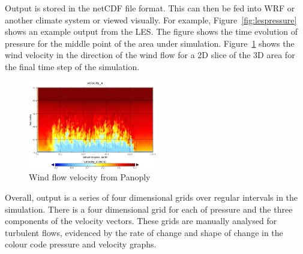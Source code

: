 Output is stored in the netCDF file format. This can then be fed into WRF or
another climate system or viewed visually. For example,
Figure~\ref{fig:lespressure} shows an example output from the LES. The figure
shows the time evolution of pressure for the middle point of the area under
simulation. Figure~\ref{fig:lesvelocity} shows the wind velocity in the
direction of the wind flow for a 2D slice of the 3D area for the final time step
of the simulation.

\begin{figure}
    \includegraphics[width=0.5\textwidth]{graphs/velocity_x_in_LES_output_u.png}
    \caption{Wind flow velocity from Panoply}
    \label{fig:lesvelocity}
\end{figure}

Overall, output is a series of four dimensional grids over regular intervals in
the simulation. There is a four dimensional grid for each of pressure and the
three components of the velocity vectors. These grids are manually analysed for
turbulent flows, evidenced by the rate of change and shape of change in the
colour code pressure and velocity graphs.
